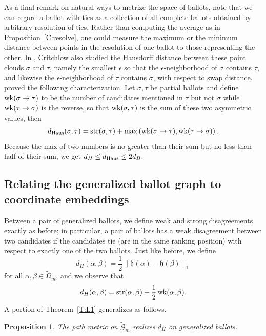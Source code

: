 \documentclass{amsart}
\newcommand{\WG}{\widetilde{\mathcal{G}}}
\newcommand{\WO}{\widetilde{\Omega}}
\newcommand{\str}{\mathop{\rm str}}
\newcommand{\wk}{\mathop{\rm wk}}
\newcommand{\dHaus}{d_{\hbox{\rm \scriptsize Haus}}}
\newcommand{\hh}{\mathfrak{h}}
\theoremstyle{plain}
\newtheorem{proposition}[theorem]{Proposition}
\theoremstyle{definition}
\theoremstyle{remark}
\begin{document}
As a final remark on natural ways to metrize the space of ballots, note that we can regard a ballot with ties as a collection of all complete ballots obtained by arbitrary resolution of ties.  
Rather than computing the average as in Proposition~\ref{C:resolve}, one could measure the maximum or the minimum distance between points in the resolution of one ballot to those representing the other.  In \cite{Critchlow_1985}, Critchlow also studied the  Hausdorff distance between these point clouds $\bar\sigma$ and $\bar\tau$, namely the smallest $\epsilon$ so that the $\epsilon$-neighborhood of $\bar\sigma$ contains $\bar\tau$, and likewise the $\epsilon$-neighborhood of $\bar\tau$ contains $\bar\sigma$, with respect to swap distance.   \citet{Fagin_Kumar_Mahdian_Sivakumar_Vee_2006} proved the
following characterization.  Let $\sigma,\tau$ be partial ballots and define $\wk(\sigma\to\tau)$ to be the number of candidates mentioned in $\tau$ but not $\sigma$ while $\wk(\tau\to\sigma)$ is the reverse, so that $\wk(\sigma,\tau)$ is the sum of these two asymmetric values, then 
$$\dHaus(\sigma,\tau) = \str(\sigma,\tau) + 
\max\left(
\wk(\sigma\to\tau),\wk(\tau\to\sigma)
\right).$$
Because the max of two numbers is no greater than their sum but no less than half of their sum, we get $d_H\le \dHaus \le 2d_B$.

\subsection{Relating the generalized ballot graph to coordinate embeddings}
Between a pair of generalized ballots, we define weak and strong disagreements exactly as before; in particular, a pair of ballots has a weak disagreement between two candidates if the candidates tie (are in the same ranking position) with respect to exactly one of the two ballots.  Just like before, we define $$d_H(\alpha,\beta) = \frac 12 \|\hh(\alpha)-\hh(\beta)\|_1$$ for all $\alpha,\beta\in\WO_m$, and we observe that
$$d_H(\alpha,\beta) = \str(\alpha,\beta) + \frac 12 \wk(\alpha,\beta).$$  
A portion of Theorem~\ref{T:L1} generalizes as follows.

\begin{proposition} The path metric on  $\WG_m$ realizes $d_H$ on generalized ballots.
\end{proposition}
\end{document}
